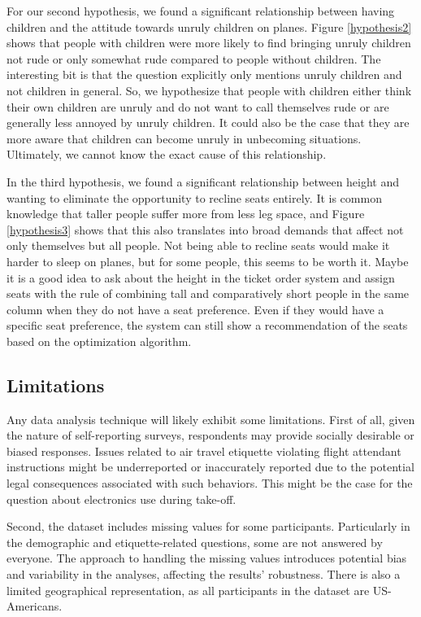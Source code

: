 \documentclass{article}
\theoremstyle{plain}
\theoremstyle{definition}
\theoremstyle{remark}
\begin{document}
For our second hypothesis, we found a significant relationship between having children and the attitude towards unruly children on planes. Figure \ref{hypothesis2} shows that people with children were more likely to find bringing unruly children not rude or only somewhat rude compared to people without children. The interesting bit is that the question explicitly only mentions unruly children and not children in general. So, we hypothesize that people with children either think their own children are unruly and do not want to call themselves rude or are generally less annoyed by unruly children. It could also be the case that they are more aware that children can become unruly in unbecoming situations. Ultimately, we cannot know the exact cause of this relationship. 

In the third hypothesis, we found a significant relationship between height and wanting to eliminate the opportunity to recline seats entirely. It is common knowledge that taller people suffer more from less leg space, and Figure \ref{hypothesis3} shows that this also translates into broad demands that affect not only themselves but all people. Not being able to recline seats would make it harder to sleep on planes, but for some people, this seems to be worth it. Maybe it is a good idea to ask about the height in the ticket order system and assign seats with the rule of combining tall and comparatively short people in the same column when they do not have a seat preference. Even if they would have a specific seat preference, the system can still show a recommendation of the seats based on the optimization algorithm.

\subsection{Limitations}
Any data analysis technique will likely exhibit some limitations. First of all, given the nature of self-reporting surveys, respondents may provide socially desirable or biased responses. Issues related to air travel etiquette violating flight attendant instructions might be underreported or inaccurately reported due to the potential legal consequences associated with such behaviors. This might be the case for the question about electronics use during take-off.

Second, the dataset includes missing values for some participants. Particularly in the demographic and etiquette-related questions, some are not answered by everyone. The approach to handling the missing values introduces potential bias and variability in the analyses, affecting the results' robustness. There is also a limited geographical representation, as all participants in the dataset are US-Americans. 
\end{document}
